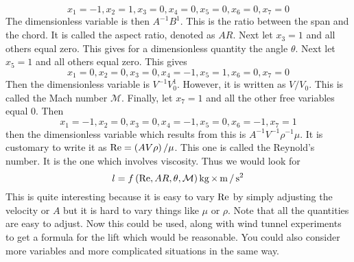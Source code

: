 \begin{equation*}
x_{1}=-1,x_{2}=1,x_{3}=0,x_{4}=0,x_{5}=0,x_{6}=0,x_{7}=0
\end{equation*}
The dimensionless variable is then $A^{-1}B^{1}$. This is the ratio between
the span and the chord. It is called the aspect ratio, denoted as $AR$. Next
let $x_{3}=1$ and all others equal zero. This gives for a dimensionless
quantity the angle $\theta $. Next let $x_{5}=1$ and all others equal zero.
This gives
\begin{equation*}
x_{1}=0,x_{2}=0,x_{3}=0,x_{4}=-1,x_{5}=1,x_{6}=0,x_{7}=0
\end{equation*}
Then the dimensionless variable is $V^{-1}V_{0}^{1}.$ However, it is written
as $V/V_{0}$. This is called the Mach number $\mathcal{M}$. Finally, let 
$x_{7}=1$ and all the other free variables equal 0. Then 
\begin{equation*}
x_{1}=-1,x_{2}=0,x_{3}=0,x_{4}=-1,x_{5}=0,x_{6}=-1,x_{7}=1
\end{equation*}
then the dimensionless variable which results from this is $A^{-1}V^{-1}\rho
^{-1}\mu .$ It is customary to write it as $\mbox{Re}=\left( AV\rho \right)
/\mu $. This one is called the Reynold's number. It is the one which
involves viscosity. Thus we would look for 
\begin{equation*}
l=f\left( \mbox{Re},AR,\theta ,\mathcal{M}\right) \mathop{\textrm{kg}}\nolimits\times \mathop{\textrm{m}}\nolimits/\mathop{\textrm{s}}\nolimits ^{2}
\end{equation*}
This is quite interesting because it is easy to vary $\mbox{Re}$ by simply
adjusting the velocity or $A$ but it is hard to vary things like $\mu $ or $%
\rho $. Note that all the quantities are easy to adjust. Now this could be
used, along with wind tunnel experiments to get a formula for the lift which
would be reasonable. You could also consider more variables and more
complicated situations in the same way.

\endgroup
